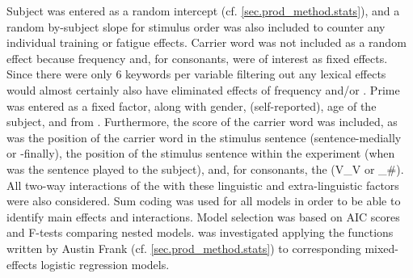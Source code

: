Subject was entered as a random intercept (cf. \ref{sec.prod_method.stats}), and a random by-subject slope for stimulus order was also included to counter any individual training or fatigue effects.
Carrier word was not included as a random effect because frequency and, for consonants,  were of interest as fixed effects.
Since there were only 6 keywords per variable filtering out any lexical effects would almost certainly also have eliminated effects of frequency and/or .
Prime was entered as a fixed factor, along with gender,  (self-reported), age of the subject, and  from .
Furthermore, the  score of the carrier word was included, as was the position of the carrier word in the stimulus sentence (sentence-medially or -finally), the position of the stimulus sentence within the experiment (when was the sentence played to the subject), and, for consonants, the  (V\_V or \_\#).
All two-way interactions of the  with these linguistic and extra-linguistic factors were also considered.
Sum coding was used for all models in order to be able to identify main effects and interactions.
Model selection was based on AIC scores and F-tests comparing nested models.
 was investigated applying the functions written by Austin Frank (cf. \ref{sec.prod_method.stats}) to corresponding mixed-effects logistic regression models.